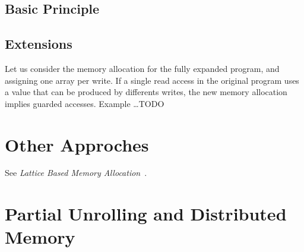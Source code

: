 \documentclass{article}
\begin{document}
\subsection{Basic Principle}
\label{sec:successive_modulo}
\subsection{Extensions}

Let us consider the memory allocation for the fully expanded program, and
assigning one array per write. If a single read access in the original program
uses a value that can be produced by differents writes, the new memory
allocation implies guarded accesses. Example \ldots TODO

{\center\noindent\makebox[\linewidth]{\rule{0.7\paperwidth}{0.4pt}}}
\section{Other Approches}
See \emph{Lattice Based Memory Allocation}~\cite{BeeAlias07}.

\appendix

{\center\noindent\makebox[\linewidth]{\rule{0.7\paperwidth}{0.4pt}}}
\section{Partial Unrolling and Distributed Memory}

{\center\noindent\makebox[\linewidth]{\rule{0.7\paperwidth}{0.4pt}}}


\end{document}
